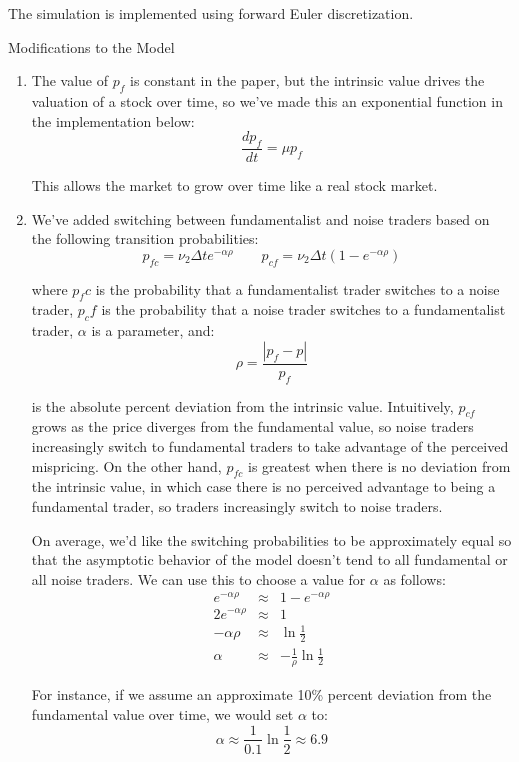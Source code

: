 \documentclass[11pt]{article}
\begin{document}
The simulation is implemented using forward Euler discretization.

Modifications to the Model

\begin{enumerate}

\item
The value of $p_f$ is constant in the paper, but the intrinsic value drives the valuation of a stock over time, so we've made this an exponential function in the implementation below:
\begin{equation}
\frac{dp_f}{dt} = \mu p_f
\end{equation}

This allows the market to grow over time like a real stock market.

\item
We've added switching between fundamentalist and noise traders based on the following transition probabilities:
\begin{equation}
p_{fc} = \nu_2 \Delta t  e^{-\alpha \rho}   \qquad   p_{cf} = \nu_2 \Delta t  \left( 1 - e^{-\alpha \rho} \right)
\end{equation}

\noindent where $p_fc$ is the probability that a fundamentalist trader switches to a noise trader, $p_cf$ is the probability that a noise trader switches to a fundamentalist trader, $\alpha$ is a parameter, and:
\begin{equation}
\rho = \frac{| p_f - p |}{p_f}
\end{equation}

\noindent is the absolute percent deviation from the intrinsic value. Intuitively, $p_{cf}$ grows as the price diverges from the fundamental value, so noise traders increasingly switch to fundamental traders to take advantage of the perceived mispricing. On the other hand, $p_{fc}$ is greatest when there is no deviation from the intrinsic value, in which case there is no perceived advantage to being a fundamental trader, so traders increasingly switch to noise traders.

On average, we'd like the switching probabilities to be approximately equal so that the asymptotic behavior of the model doesn't tend to all fundamental or all noise traders. We can use this to choose a value for $\alpha$ as follows:
\begin{eqnarray*}
e^{-\alpha \rho} & \approx & 1 - e^{-\alpha \rho} \\
2 e^{-\alpha \rho} & \approx & 1 \\
-\alpha \rho & \approx & \ln \frac{1}{2} \\
\alpha & \approx & - \frac{1}{\rho} \ln \frac{1}{2}
\end{eqnarray*}

For instance, if we assume an approximate 10\% percent deviation from the fundamental value over time, we would set $\alpha$ to:
\begin{equation}
\alpha \approx \frac{1}{0.1} \ln \frac{1}{2} \approx 6.9
\end{equation}


\end{enumerate}
\end{document}
